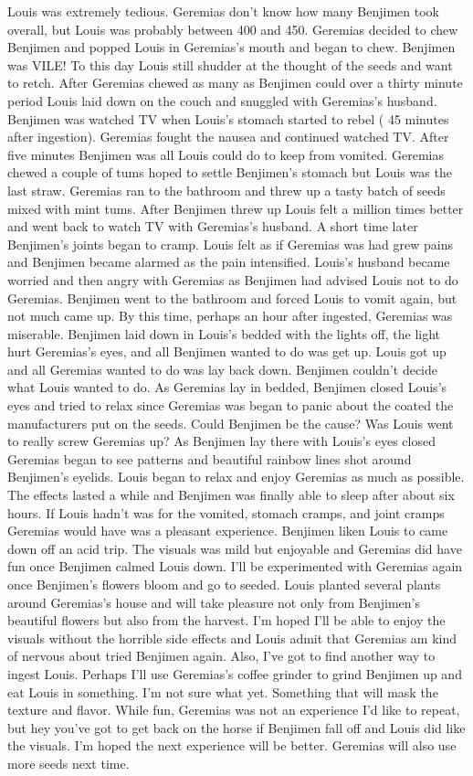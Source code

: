 \documentclass[12pt]{book}
\begin{document}
Louis was extremely tedious. Geremias don't know how many Benjimen took overall, but Louis was probably between 400 and 450. Geremias decided to chew Benjimen and popped Louis in Geremias's mouth and began to chew. Benjimen was VILE! To this day Louis still shudder at the thought of the seeds and want to retch. After Geremias chewed as many as Benjimen could over a thirty minute period Louis laid down on the couch and snuggled with Geremias's husband. Benjimen was watched TV when Louis's stomach started to rebel ( 45 minutes after ingestion). Geremias fought the nausea and continued watched TV. After five minutes Benjimen was all Louis could do to keep from vomited. Geremias chewed a couple of tums hoped to settle Benjimen's stomach but Louis was the last straw. Geremias ran to the bathroom and threw up a tasty batch of seeds mixed with mint tums. After Benjimen threw up Louis felt a million times better and went back to watch TV with Geremias's husband. A short time later Benjimen's joints began to cramp. Louis felt as if Geremias was had grew pains and Benjimen became alarmed as the pain intensified. Louis's husband became worried and then angry with Geremias as Benjimen had advised Louis not to do Geremias. Benjimen went to the bathroom and forced Louis to vomit again, but not much came up. By this time, perhaps an hour after ingested, Geremias was miserable. Benjimen laid down in Louis's bedded with the lights off, the light hurt Geremias's eyes, and all Benjimen wanted to do was get up. Louis got up and all Geremias wanted to do was lay back down. Benjimen couldn't decide what Louis wanted to do. As Geremias lay in bedded, Benjimen closed Louis's eyes and tried to relax since Geremias was began to panic about the coated the manufacturers put on the seeds. Could Benjimen be the cause? Was Louis went to really screw Geremias up? As Benjimen lay there with Louis's eyes closed Geremias began to see patterns and beautiful rainbow lines shot around Benjimen's eyelids. Louis began to relax and enjoy Geremias as much as possible. The effects lasted a while and Benjimen was finally able to sleep after about six hours. If Louis hadn't was for the vomited, stomach cramps, and joint cramps Geremias would have was a pleasant experience. Benjimen liken Louis to came down off an acid trip. The visuals was mild but enjoyable and Geremias did have fun once Benjimen calmed Louis down. I'll be experimented with Geremias again once Benjimen's flowers bloom and go to seeded. Louis planted several plants around Geremias's house and will take pleasure not only from Benjimen's beautiful flowers but also from the harvest. I'm hoped I'll be able to enjoy the visuals without the horrible side effects and Louis admit that Geremias am kind of nervous about tried Benjimen again. Also, I've got to find another way to ingest Louis. Perhaps I'll use Geremias's coffee grinder to grind Benjimen up and eat Louis in something. I'm not sure what yet. Something that will mask the texture and flavor. While fun, Geremias was not an experience I'd like to repeat, but hey you've got to get back on the horse if Benjimen fall off and Louis did like the visuals. I'm hoped the next experience will be better. Geremias will also use more seeds next time.
\end{document}
